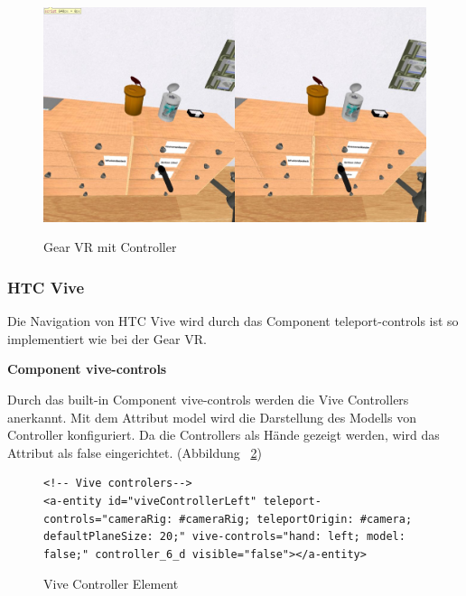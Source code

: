 \begin{figure}[ht]
\vspace*{1em}
\centering
\caption[Gear VR mit Controller]{Gear VR mit Controller}
\includegraphics[width=\textwidth]{images/gearVRWithController.png}
\label{fig:GearVRWithController} 
\end{figure}
  
  \subsubsection{HTC Vive}
  
  Die Navigation von HTC Vive wird durch das Component {\selectfont teleport-controls} ist so implementiert wie bei der Gear VR.
  
  \vspace{1em}
  \noindent
  \textbf{Component vive-controls}
  \vspace{1em}
  
  \noindent
  Durch das built-in Component {\selectfont vive-controls} werden die Vive Controllers anerkannt. Mit dem Attribut {\selectfont model} wird die Darstellung des Modells von Controller konfiguriert. Da die Controllers als Hände gezeigt werden, wird das Attribut als {\selectfont false} eingerichtet. (Abbildung ~\ref{fig:viveControllerElement})
  
\begin{figure}[ht]
\vspace*{1em}
\centering
\caption[Vive Controller Element]{Vive Controller Element}
\begin{lstlisting}[language=HTML5, style=htmlcssjs]
<!-- Vive controlers-->
<a-entity id="viveControllerLeft" teleport-controls="cameraRig: #cameraRig; teleportOrigin: #camera; defaultPlaneSize: 20;" vive-controls="hand: left; model: false;" controller_6_d visible="false"></a-entity>
\end{lstlisting}
\label{fig:viveControllerElement} 
\end{figure}
  
